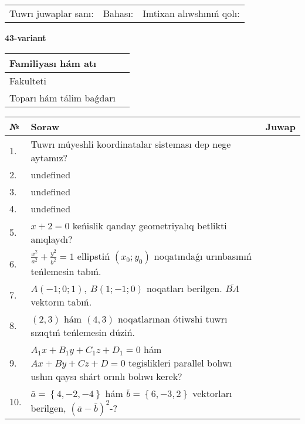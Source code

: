 \documentclass{article}
\begin{document}
\vspace{0.7cm}

\begin{tabular}{lll}
Tuwrı juwaplar sanı: \underline{\hspace{1cm}} & 
Bahası: \underline{\hspace{1cm}} & 
Imtixan alıwshınıń qolı: \underline{\hspace{2cm}} \\
\end{tabular}

\egroup

\newpage


\textbf{43-variant}\\

\bgroup
\def\arraystretch{1.6} %

\begin{tabular}{|m{5.7cm}|m{9.5cm}|}
\hline
Familiyası hám atı & \\
\hline
Fakulteti  & \\
\hline
Toparı hám tálim baǵdarı  & \\
\hline
\end{tabular}

\vspace{0.7cm}

\begin{tabular}{|m{0.7cm}|m{10cm}|m{4cm}|}
\hline
№ & Soraw & Juwap \\
\hline
1. & Tuwrı múyeshli koordinatalar sisteması dep nege aytamız? &  \\
\hline
2. & undefined &  \\
\hline
3. & undefined &  \\
\hline
4. & undefined &  \\
\hline
5. & \(x + 2 = 0\) keńislik qanday geometriyalıq betlikti anıqlaydı? &  \\
\hline
6. & \(\frac{x^{2}}{a^{2}} + \frac{y^{2}}{b^{2}} = 1\) ellipstiń \((x_{0};y_{0})\) noqatındaǵı urınbasınıń teńlemesin tabıń. &  \\
\hline
7. & \(A (- 1;0;1),\ B (1; - 1;0)\) noqatları berilgen. \(\bar{BA}\) vektorın tabıń. &  \\
\hline
8. & $(2, 3)$ hám $(4, 3)$ noqatlarınan ótiwshi tuwrı sızıqtıń teńlemesin dúziń. &  \\
\hline
9. & \(A_{1}x + B_{1}y + C_{1}z + D_{1} = 0\) hám \(Ax + By + Cz + D = 0\) tegislikleri parallel bolıwı ushın qaysı shárt orınlı bolıwı kerek? &  \\
\hline
10. & \(\bar{a} = \left\{ 4,- 2,- 4 \right\}\) hám \(\bar{b} = \left\{ 6,- 3, 2 \right\}\) vektorları berilgen, \((\bar{a} - \bar{b}) ^{2}\)-? & \\
\hline
\end{tabular}
\end{document}
